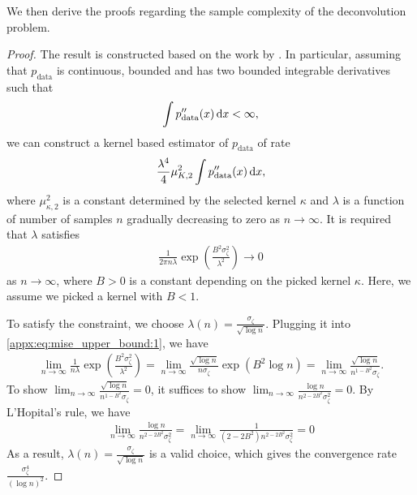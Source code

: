 We then derive the proofs regarding the sample complexity of the deconvolution problem. 
\MISEUpperBdound*
\begin{proof}
    The result is constructed based on the work by \citet{StefanskiC1990}. In particular, assuming that $p_\text{data}$ is continuous, bounded and has two bounded integrable derivatives such that 
    \begin{align}
        \int p''_\text{data} (x) \,\mathrm{d} x < \infty,
    \end{align}
    we can construct a kernel based estimator of $p_\text{data}$ of rate
    \begin{align}
        \frac{\lambda^4}{4} \mu^2_{K, 2} \int p''_\text{data} (x) \,\mathrm{d} x,
    \end{align}
    where $\mu^2_{\kappa, 2}$ is a constant determined by the selected kernel $\kappa$ and $\lambda$ is a function of number of samples $n$ gradually decreasing to zero as $n \rightarrow \infty$. It is required that $\lambda$ satisfies
    \begin{align}
        \frac{1}{2 \pi n \lambda} \exp( \frac{B^2 \sigma_\zeta^2}{\lambda^2}) \rightarrow 0 \label{appx:eq:mise_upper_bound:1}
    \end{align}
    as $n \rightarrow \infty$, where $B > 0$ is a constant depending on the picked kernel $\kappa$. Here, we assume we picked a kernel with $B < 1$.    
    
    To satisfy the constraint, we choose $\lambda (n) = \frac{\sigma_\zeta}{\sqrt{\log n}}$. Plugging it into \cref{appx:eq:mise_upper_bound:1}, we have 
    \begin{align}
        \lim_{n \rightarrow \infty} \frac{1}{n \lambda} \exp( \frac{B^2 \sigma_\zeta^2}{\lambda^2}) = \lim_{n \rightarrow \infty} \frac{\sqrt{\log n}}{n {\sigma_\zeta }} \exp{(B^2 \log n)} = \lim_{n \rightarrow \infty} \frac{\sqrt{\log n}}{n^{1-B^2} {\sigma_\zeta }}. 
    \end{align}
    To show $\lim_{n \rightarrow \infty} \frac{\sqrt{\log n}}{n^{1-B^2} {\sigma_\zeta }} = 0$, it suffices to show 
    $
        \lim_{n \rightarrow \infty} \frac{\log n}{n^{2 - 2 B^2} {\sigma_\zeta^2 }} = 0
    $. By L'Hopital's rule, we have
    \begin{align}
        \lim_{n \rightarrow \infty} \frac{\log n}{n^{2 - 2 B^2} {\sigma_\zeta^2 }} =  \lim_{n \rightarrow \infty} \frac{1}{(2 - 2 B^2) n^{2 - 2 B^2} {\sigma_\zeta^2 }} = 0
    \end{align}
    As a result, $\lambda (n) = \frac{\sigma_\zeta}{\sqrt{\log n}}$ is a valid choice, which gives the convergence rate
    $\frac{\sigma_\zeta^4}{(\log n)^2}$.
\end{proof}

